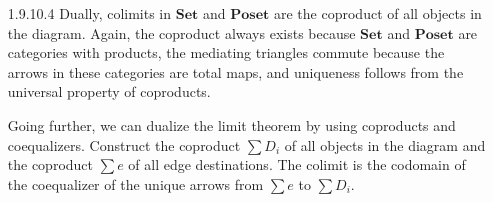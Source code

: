 \documentclass{article}
\newcommand{\cset}{\mathbf{Set}}
\newcommand{\cposet}{\mathbf{Poset}}
\begin{document}
\begin{enumerate}
\begin{center}
  \end{center}

\item[]
\item[1.9.10.4]
  Dually, colimits in $\cset$ and $\cposet$ are the coproduct of all objects in the diagram.
  Again, the coproduct always exists because $\cset$ and $\cposet$ are categories with products, the mediating triangles commute because the arrows in these categories are total maps, and uniqueness follows from the universal property of coproducts.

  Going further, we can dualize the limit theorem by using coproducts and coequalizers.
  Construct the coproduct $\sum D_i$ of all objects in the diagram and the coproduct $\sum e$ of all edge destinations.
  The colimit is the codomain of the coequalizer of the unique arrows from $\sum e$ to $\sum D_i$.
  
\end{enumerate}
\end{document}
